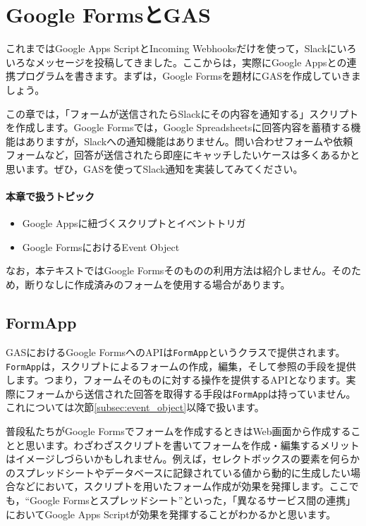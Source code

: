 \documentclass[uplatex,a4j]{jsarticle}
\begin{document}
\section{Google FormsとGAS}

これまではGoogle Apps ScriptとIncoming Webhooksだけを使って，Slackにいろいろなメッセージを投稿してきました。ここからは，実際にGoogle Appsとの連携プログラムを書きます。まずは，Google Formsを題材にGASを作成していきましょう。

この章では，「フォームが送信されたらSlackにその内容を通知する」スクリプトを作成します。Google Formsでは，Google Spreadsheetsに回答内容を蓄積する機能はありますが，Slackへの通知機能はありません。問い合わせフォームや依頼フォームなど，回答が送信されたら即座にキャッチしたいケースは多くあるかと思います。ぜひ，GASを使ってSlack通知を実装してみてください。

\paragraph{本章で扱うトピック}
\begin{itemize}
\item Google Appsに紐づくスクリプトとイベントトリガ
\item Google FormsにおけるEvent Object
\end{itemize}

なお，本テキストではGoogle Formsそのものの利用方法は紹介しません。そのため，断りなしに作成済みのフォームを使用する場合があります。

\subsection{FormApp}

GASにおけるGoogle FormsへのAPIは\verb|FormApp|というクラスで提供されます。\verb|FormApp|は，スクリプトによるフォームの作成，編集，そして参照の手段を提供します。つまり，フォームそのものに対する操作を提供するAPIとなります。実際にフォームから送信された回答を取得する手段は\verb|FormApp|は持っていません。これについては次節\ref{subsec:event_object}以降で扱います。

普段私たちがGoogle Formsでフォームを作成するときはWeb画面から作成することと思います。わざわざスクリプトを書いてフォームを作成・編集するメリットはイメージしづらいかもしれません。例えば，セレクトボックスの要素を何らかのスプレッドシートやデータベースに記録されている値から動的に生成したい場合などにおいて，スクリプトを用いたフォーム作成が効果を発揮します。ここでも，``Google Formsとスプレッドシート''といった，「異なるサービス間の連携」においてGoogle Apps Scriptが効果を発揮することがわかるかと思います。
\end{document}
